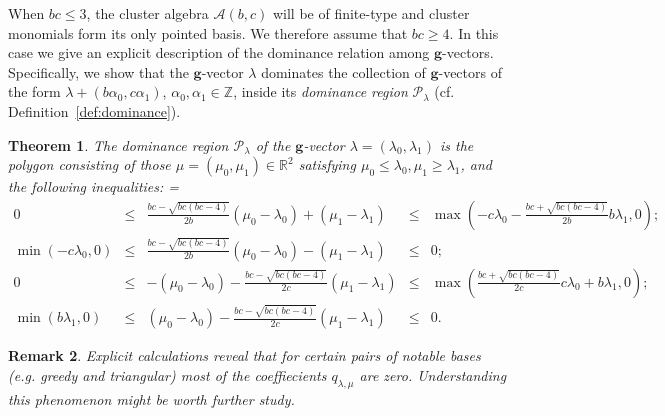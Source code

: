 \documentclass[pdflatex,sn-mathphys]{sn-jnl}%
\theoremstyle{thmstyleone}%
\newtheorem{theorem}{Theorem}[section]%
\theoremstyle{thmstyletwo}%
\newtheorem{remark}[theorem]{Remark}%
\theoremstyle{thmstylethree}%
\newcommand{\bfg}{\boldsymbol{g}}
\newcommand{\cA}{\mathcal{A}}
\newcommand{\cP}{\mathcal{P}}
\newcommand{\RR}{\mathbb{R}}
\newcommand{\ZZ}{\mathbb{Z}}
\begin{document}
  When $bc\le3$, the cluster algebra $\cA(b,c)$ will be of finite-type and cluster monomials form its only pointed basis.
  We therefore assume that $bc\ge4$.
  In this case we give an explicit description of the dominance relation among $\bfg$-vectors.
  Specifically, we show that the $\bfg$-vector $\lambda$ dominates the collection of $\bfg$-vectors of the form $\lambda+(b \alpha_0 ,c \alpha_1)$, $\alpha_0,\alpha_1\in\ZZ$, inside its \emph{dominance region} $\cP_\lambda$ (cf. Definition~\ref{def:dominance}).
  \begin{theorem}
    \label{th:dominance inequalities}
    The dominance region $\cP_\lambda$ of the $\bfg$-vector $\lambda=(\lambda_0,\lambda_1)$ is the polygon consisting of those $\mu=(\mu_0,\mu_1)\in\RR^2$ satisfying $\mu_0 \leq \lambda_0, \mu_1 \geq\lambda_1$, and the following inequalities:
    {
      \everymath={\displaystyle}
      \def\arraystretch{2.2}
      \[
        \begin{array}{rcccl}
          0 & \!\leq\! & \frac{b c-\sqrt{b c (b c-4)}}{2 b}(\mu_0-\lambda_0)+(\mu_1-\lambda_1) & \!\leq\! & \max\left(-c\lambda_0-\frac{b c+\sqrt{b c (b c-4)}}{2b}b\lambda_1,0\right)\!\!;
          \\
          \min\left(-c\lambda_0,0\right) & \!\leq\! & \frac{b c-\sqrt{b c (b c-4)}}{2 b}(\mu_0-\lambda_0)-(\mu_1-\lambda_1) & \!\leq\! & 0;
          \\
          0 & \!\leq\! &  -(\mu_0-\lambda_0)-\frac{b c-\sqrt{b c (b c-4)}}{2 c}(\mu_1-\lambda_1) & \!\leq\! & \max\left(\frac{b c+\sqrt{b c (b c-4)}}{2c}c\lambda_0+b\lambda_1,0\right)\!\!;
          \\
          \min\left(b \lambda_1,0\right) & \!\leq\! & (\mu_0-\lambda_0) - \frac{b c-\sqrt{b c (b c-4)}}{2 c} (\mu_1-\lambda_1) & \!\leq\! & 0.
        \end{array}
      \]
    }
    
  \vspace{-1.05em}
  \end{theorem}
  \begin{remark}
    Explicit calculations reveal that for certain pairs of notable bases (e.g. greedy and triangular) most of the coeffiecients $q_{\lambda,\mu}$ are zero.
    Understanding this phenomenon might be worth further study.
  \end{remark}
\end{document}
